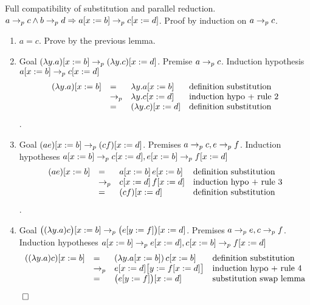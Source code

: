 \begin{lemma}
  Full compatibility of substitution and parallel reduction.
  $a \to_{p} c \land b \to_{p} d  \Rightarrow a[x := b] \to_{p} c[x := d]$. Proof
  by induction on $a \to_{p} c $.
  \begin{enumerate}
  \item
    $a=c$. Prove by the previous lemma.
  \item
    Goal $(\lambda y.a) [x := b] \to_{p} (\lambda y.c) [x := d]$.
    Premise $a \to_{p} c$. Induction
    hypothesis $a[x := b] \to_{p} c[x := d]$
    $$
    \begin{array}{llll}
      (\lambda y.a)[x := b]  &=& \lambda y.a [x := b] &\text{definition substitution} \\
                             &\to_{p}& \lambda y.c[x := d]  &\text{induction hypo + rule 2} \\
                             &=& (\lambda y.c)[x := d]           &\text{definition substitution}
    \end{array}
    $$.
  \item
    Goal $(a e) [x := b] \to_{p} (c f) [x := d]$.
    Premises $a\to_{p} c, e\to_{p} f$.
    Induction hypotheses
      $a[x := b] \to_{p} c[x := d],
       e[x := b] \to_{p} f[x := d]$
    $$
    \begin{array}{llll}
      (a e)[x := b]  &=& a[x := b]\, e[x := b] &\text{definition substitution}\\
                     &\to_{p}& c[x := d] \, f[x := d] &\text{induction hypo + rule 3} \\
                     &=& (c f)[x := d] &\text{definition substitution}
    \end{array}
    $$.
  \item
    Goal $\big((\lambda y.a) c\big) [x := b] \to_{p} \big(e[y:=f]\big)[x := d]$.
    Premises $a \to_{p} e, c \to_{p} f$.
    Induction hypotheses
      $a[x:=b] \to_{p} e[x := d],
        c[x:=b]  \to_{p} f[x := d]$
    $$
    \begin{array}{llll}
      ((\lambda y.a) c)[x := b]  &=& (\lambda y.a[x := b])\, c[x := b] &
                                                                         \text{definition substitution}\\
                     &\to_{p}& e[x := d]\big[y:=f[x := d]\big] &
                                                                  \text{induction hypo + rule 4} \\
                     &=& \big(e[y:=f]\big)[x := d] &
                                                                  \text{substitution
                                                           swap lemma}
    \end{array}
    $$
  \end{enumerate}
  $\qed$
\end{lemma}





